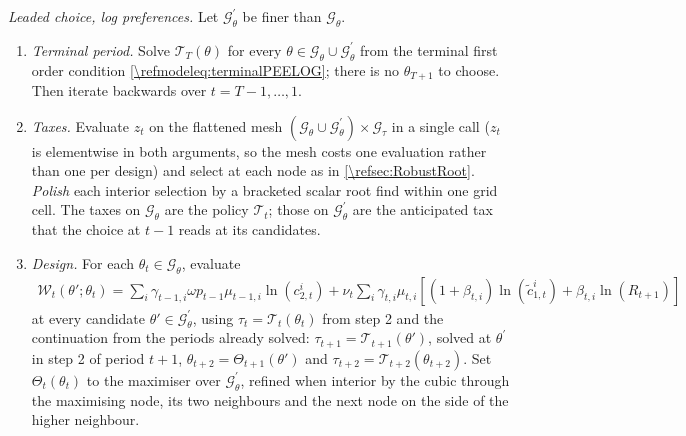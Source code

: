 \begin{alg}\label{\refalg:esc:leaded}
\emph{Leaded choice, log preferences.} Let $\mathcal{G}_{\theta}^{\prime}$ be finer than $\mathcal{G}_{\theta}$.
\begin{enumerate}
    \item \emph{Terminal period.} Solve $\mathcal{T}_{T}(\theta)$ for every $\theta\in\mathcal{G}_{\theta}\cup\mathcal{G}_{\theta}^{\prime}$ from the terminal first order condition \eqref{\refmodeleq:terminalPEELOG}; there is no $\theta_{T+1}$ to choose. Then iterate backwards over $t = T-1,\dots,1$.
    \item \emph{Taxes.} Evaluate $z_t$ on the flattened mesh $\left(\mathcal{G}_{\theta}\cup\mathcal{G}_{\theta}^{\prime}\right)\times\mathcal{G}_{\tau}$ in a single call ($z_t$ is elementwise in both arguments, so the mesh costs one evaluation rather than one per design) and select at each node as in \cref{\refsec:RobustRoot}. \emph{Polish} each interior selection by a bracketed scalar root find within one grid cell. The taxes on $\mathcal{G}_{\theta}$ are the policy $\mathcal{T}_t$; those on $\mathcal{G}_{\theta}^{\prime}$ are the anticipated tax that the choice at $t-1$ reads at its candidates.
    \item \emph{Design.} For each $\theta_t\in\mathcal{G}_{\theta}$, evaluate
    \begin{align}\label{\refeq:esc:leadedObjective}
        \mathcal{W}_t\left(\theta';\theta_t\right) = \sum_i \gamma_{t-1,i}\omega p_{t-1}\mu_{t-1,i}\ln\left(c_{2,t}^i\right) + \nu_t\sum_i \gamma_{t,i}\mu_{t,i}\left[(1+\beta_{t,i})\ln\left(\tilde{c}_{1,t}^i\right)+\beta_{t,i}\ln\left(R_{t+1}\right)\right]
    \end{align}
    at every candidate $\theta'\in\mathcal{G}_{\theta}^{\prime}$, using $\tau_t = \mathcal{T}_t(\theta_t)$ from step 2 and the continuation from the periods already solved: $\tau_{t+1} = \mathcal{T}_{t+1}(\theta')$, solved at $\theta^{\prime}$ in step 2 of period $t+1$, $\theta_{t+2} = \Theta_{t+1}(\theta')$ and $\tau_{t+2} = \mathcal{T}_{t+2}(\theta_{t+2})$. Set $\Theta_t(\theta_t)$ to the maximiser over $\mathcal{G}_{\theta}^{\prime}$, refined when interior by the cubic through the maximising node, its two neighbours and the next node on the side of the higher neighbour.
\end{enumerate}
\end{alg}

